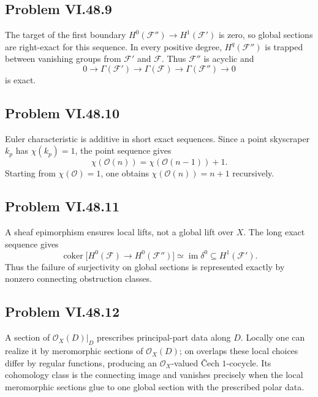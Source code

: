 \subsection*{Problem VI.48.9}
\begin{solution}
The target of the first boundary \(H^0(\mathcal F'')\to H^1(\mathcal F')\) is zero, so global sections are right-exact for this sequence.  In every positive degree, \(H^q(\mathcal F'')\) is trapped between vanishing groups from \(\mathcal F'\) and \(\mathcal F\).  Thus \(\mathcal F''\) is acyclic and
\[
0\to\Gamma(\mathcal F')\to\Gamma(\mathcal F)\to\Gamma(\mathcal F'')\to0
\]
is exact.
\end{solution}

\subsection*{Problem VI.48.10}
\begin{solution}
Euler characteristic is additive in short exact sequences.  Since a point skyscraper \(k_p\) has \(\chi(k_p)=1\), the point sequence gives
\[
\chi(\mathcal O(n))=\chi(\mathcal O(n-1))+1.
\]
Starting from \(\chi(\mathcal O)=1\), one obtains \(\chi(\mathcal O(n))=n+1\) recursively.
\end{solution}

\subsection*{Problem VI.48.11}
\begin{solution}
A sheaf epimorphism ensures local lifts, not a global lift over \(X\).  The long exact sequence gives
\[
\operatorname{coker}\bigl[H^0(\mathcal F)\to H^0(\mathcal F'')\bigr]
\simeq \operatorname{im}\delta^0\subseteq H^1(\mathcal F').
\]
Thus the failure of surjectivity on global sections is represented exactly by nonzero connecting obstruction classes.
\end{solution}

\subsection*{Problem VI.48.12}
\begin{solution}
A section of \(\mathcal O_X(D)|_D\) prescribes principal-part data along \(D\).  Locally one can realize it by meromorphic sections of \(\mathcal O_X(D)\); on overlaps these local choices differ by regular functions, producing an \(\mathcal O_X\)-valued Čech \(1\)-cocycle.  Its cohomology class is the connecting image and vanishes precisely when the local meromorphic sections glue to one global section with the prescribed polar data.
\end{solution}

